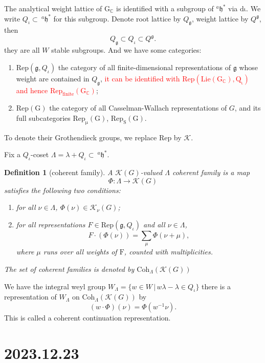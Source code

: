 \documentclass[12pt]{amsart}
\numberwithin{equation}{section}
\newtheorem{defn}[thm]{Definition}
\newcommand{\BC}{{\mathbb {C}}}
\newcommand{\fg}{\mathfrak{g}}
\newcommand{\fh}{\mathfrak{h}}
\newcommand{\set}[2]{\{#1\,|\,#2\}}
\begin{document}
The analytical weight lattice of $\mathrm{G_\BC}$ is identified with a subgroup of $^{a}\fh^*$ via $\mathrm{d\iota}$.
We write $Q_\iota \subset \  ^{a}\fh^*$ for this subgroup. Denote root lattice by $Q_\fg$,
weight lattice by $Q^\fg$, then $$Q_\fg \subset Q_\iota \subset Q^\fg.$$
they are all $W$ stable subgroups.
And we have some categories:
\begin{enumerate}
  \item $\mathrm{Rep}(\fg,Q_\iota)$ the category of all finite-dimensional representations of $\fg$ whose weight are contained in $Q_\fg$, \textcolor{red}{it can be identified with $\mathrm{Rep(Lie(G_\BC),Q_\iota)}$ and hence $\mathrm{Rep_{finite}(G_\BC)}$};
  \item $\mathrm{Rep(G)}$ the category of all Casselman-Wallach representations of $G$, and its full subcategories $\mathrm{Rep_\mu(G)}$, $\mathrm{Rep_S(G)}$.
\end{enumerate}
To denote their Grothendieck groups, we replace $\mathrm{Rep}$ by $\mathcal{K}$.


Fix a $Q_\iota$-coset $\Lambda = \lambda + Q_\iota \subset \  ^{a}\fh^*$.


\begin{defn}[coherent family]
  A $\mathcal{K}(G)$-valued $\Lambda$ coherent family is a map
  $$\varPhi : \Lambda \to \mathcal{K}(G)$$
  satisfies the following two conditions:
  \begin{enumerate}
    \item for all $\nu \in \Lambda$, $\varPhi(\nu) \in \mathcal{K}_{\nu}(G)$;
    \item for all representations $F \mathrm{ \in Rep}(\fg,Q_\iota)$ and all $\nu \in \Lambda$,
          $$F \cdot (\varPhi(\nu)) = \sum\limits_{\mu} \varPhi(\nu + \mu),$$
          where $\mu$ runs over all weights of $\mathrm{F}$, counted with multiplicities.
  \end{enumerate}
  The set of coherent families is denoted by $\mathrm{Coh}_\Lambda(\mathcal{K}(G))$
\end{defn}
We have the integral weyl group $W_{\Lambda} = \set{w \in W}{w\lambda - \lambda \in Q_\iota}$
there is a representation of $W_\Lambda$ on $\mathrm{Coh}_\Lambda(\mathcal{K}(G))$ by
$$(w \cdot \varPhi)(\nu) = \varPhi (w^{-1}\nu).$$
This is called a coherent continuation representation.

\newpage


\section{2023.12.23}\label{2}
\end{document}
